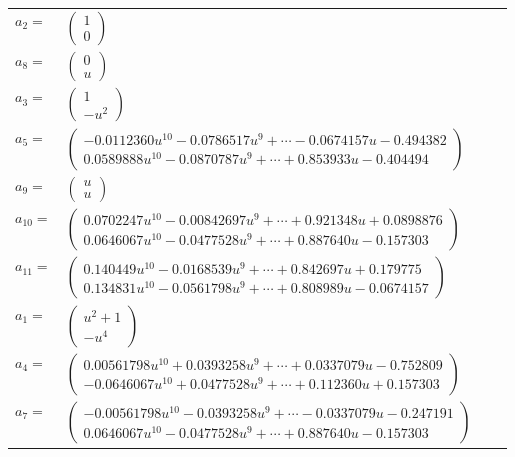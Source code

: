 \documentclass[1p]{elsarticle_modified}
\theoremstyle{definition}
\begin{document}
\begin{tabular}{m{7pt} m{180pt} m{7pt} m{180pt} }
\flushright $a_{2}=$&$\begin{pmatrix}1\\0\end{pmatrix}$ \\
\flushright $a_{8}=$&$\begin{pmatrix}0\\u\end{pmatrix}$ \\
\flushright $a_{3}=$&$\begin{pmatrix}1\\- u^2\end{pmatrix}$ \\
\flushright $a_{5}=$&$\begin{pmatrix}-0.0112360 u^{10}-0.0786517 u^{9}+\cdots-0.0674157 u-0.494382\\0.0589888 u^{10}-0.0870787 u^{9}+\cdots+0.853933 u-0.404494\end{pmatrix}$ \\
\flushright $a_{9}=$&$\begin{pmatrix}u\\u\end{pmatrix}$ \\
\flushright $a_{10}=$&$\begin{pmatrix}0.0702247 u^{10}-0.00842697 u^{9}+\cdots+0.921348 u+0.0898876\\0.0646067 u^{10}-0.0477528 u^{9}+\cdots+0.887640 u-0.157303\end{pmatrix}$ \\
\flushright $a_{11}=$&$\begin{pmatrix}0.140449 u^{10}-0.0168539 u^{9}+\cdots+0.842697 u+0.179775\\0.134831 u^{10}-0.0561798 u^{9}+\cdots+0.808989 u-0.0674157\end{pmatrix}$ \\
\flushright $a_{1}=$&$\begin{pmatrix}u^2+1\\- u^4\end{pmatrix}$ \\
\flushright $a_{4}=$&$\begin{pmatrix}0.00561798 u^{10}+0.0393258 u^{9}+\cdots+0.0337079 u-0.752809\\-0.0646067 u^{10}+0.0477528 u^{9}+\cdots+0.112360 u+0.157303\end{pmatrix}$ \\
\flushright $a_{7}=$&$\begin{pmatrix}-0.00561798 u^{10}-0.0393258 u^{9}+\cdots-0.0337079 u-0.247191\\0.0646067 u^{10}-0.0477528 u^{9}+\cdots+0.887640 u-0.157303\end{pmatrix}$ \\

\end{tabular}
\end{document}
